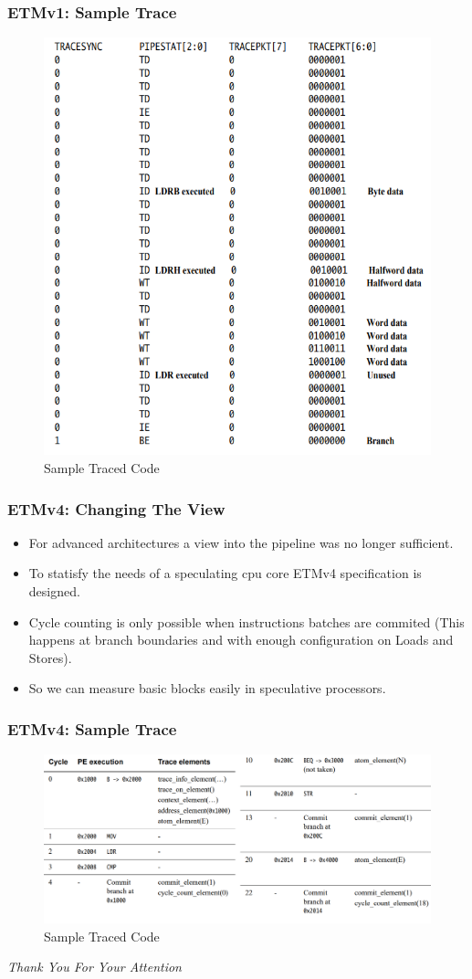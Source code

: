 \documentclass{beamer}
\begin{document}
\begin{frame}
    \frametitle{ETMv1: Sample Trace} 
        \begin{figure}
        \centering
        \includegraphics[width=0.55\columnwidth]{etmv12.png}
        \caption{Sample Traced Code}
        \label{fig:ETMv12}
    \end{figure}
\end{frame}
\begin{frame}
    \frametitle{ETMv4: Changing The View}
    \begin{itemize}
        \item For advanced architectures a view into the pipeline was no longer
            sufficient.
        \item To statisfy the needs of a speculating cpu core ETMv4
            specification is designed.
        \item Cycle counting is only possible when instructions batches are
            commited (This happens at branch boundaries and with enough
            configuration on Loads and Stores).
        \item So we can measure basic blocks easily in speculative processors.
    \end{itemize}
\end{frame}
\begin{frame}
    \frametitle{ETMv4: Sample Trace} 
        \begin{figure}
        \centering
        \includegraphics[width=0.90\columnwidth]{etmv4.png}
        \caption{Sample Traced Code}
        \label{fig:ETMv4}
    \end{figure}
\end{frame}
\begin{frame}
  \centering \Large
  \emph{Thank You For Your Attention}
\end{frame}
\end{document}
